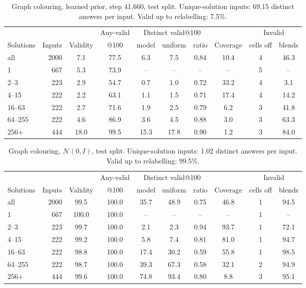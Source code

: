 \documentclass[11pt]{article}
\begin{document}
\begin{table}[H]
\centering\small
\begin{tabular}{@{}lrcccccccc@{}}
\toprule
& & & Any-valid & \multicolumn{3}{c}{Distinct valid@100} & & \multicolumn{2}{c}{Invalid} \\
\cmidrule(lr){5-7}\cmidrule(l){9-10}
Solutions & Inputs & Validity & @100 & model & uniform & ratio & Coverage & cells off & blends \\
\midrule
all & 2000 & 7.1 & 77.5 & 6.3 & 7.5 & 0.84 & 10.4 & 4 & 46.3 \\
1 & 667 & 5.3 & 73.9 & -- & -- & -- & -- & 5 & -- \\
2--3 & 223 & 2.9 & 54.7 & 0.7 & 1.0 & 0.72 & 33.2 & 4 & 3.1 \\
4--15 & 222 & 2.2 & 63.1 & 1.1 & 1.5 & 0.71 & 17.4 & 4 & 14.2 \\
16--63 & 222 & 2.7 & 71.6 & 1.9 & 2.5 & 0.79 & 6.2 & 3 & 41.8 \\
64--255 & 222 & 4.6 & 86.9 & 3.6 & 4.5 & 0.88 & 3.0 & 3 & 63.3 \\
256+ & 444 & 18.0 & 99.5 & 15.3 & 17.8 & 0.90 & 1.2 & 3 & 84.0 \\
\bottomrule
\end{tabular}
\caption{Graph colouring, learned prior, step 41{,}660, test split. Unique-solution inputs: 69.15 distinct answers per input. Valid up to relabelling: 7.5\%.}
\end{table}

\begin{table}[H]
\centering\small
\begin{tabular}{@{}lrcccccccc@{}}
\toprule
& & & Any-valid & \multicolumn{3}{c}{Distinct valid@100} & & \multicolumn{2}{c}{Invalid} \\
\cmidrule(lr){5-7}\cmidrule(l){9-10}
Solutions & Inputs & Validity & @100 & model & uniform & ratio & Coverage & cells off & blends \\
\midrule
all & 2000 & 99.5 & 100.0 & 35.7 & 48.9 & 0.75 & 46.8 & 1 & 94.5 \\
1 & 667 & 100.0 & 100.0 & -- & -- & -- & -- & 1 & -- \\
2--3 & 223 & 99.7 & 100.0 & 2.1 & 2.3 & 0.94 & 93.7 & 1 & 72.1 \\
4--15 & 222 & 99.2 & 100.0 & 5.8 & 7.4 & 0.81 & 81.0 & 1 & 94.7 \\
16--63 & 222 & 98.8 & 100.0 & 17.4 & 30.2 & 0.59 & 55.8 & 1 & 98.5 \\
64--255 & 222 & 98.7 & 100.0 & 39.3 & 67.3 & 0.58 & 32.1 & 2 & 94.9 \\
256+ & 444 & 99.6 & 100.0 & 74.8 & 93.4 & 0.80 & 8.8 & 3 & 95.1 \\
\bottomrule
\end{tabular}
\caption{Graph colouring, $\mathcal{N}(0,I)$, test split. Unique-solution inputs: 1.02 distinct answers per input. Valid up to relabelling: 99.5\%.}
\end{table}
\end{document}
